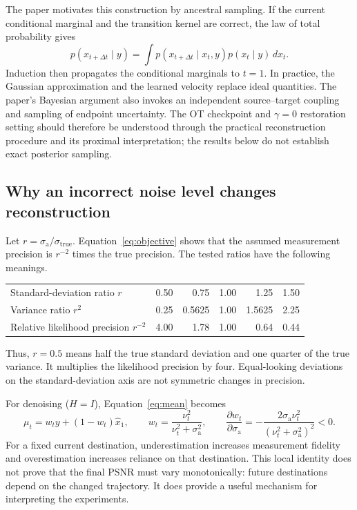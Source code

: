 \documentclass[10pt,letterpaper]{article}
\newcommand{\sa}{\sigma_{\mathrm a}}
\newcommand{\st}{\sigma_{\mathrm{true}}}
\newcommand{\xhat}{\widehat{x}_1}
\begin{document}
The paper motivates this construction by ancestral sampling. If the current conditional marginal and the transition kernel are correct, the law of total probability gives
\begin{equation}
 p(x_{t+\Delta t}\mid y)=\int p(x_{t+\Delta t}\mid x_t,y)p(x_t\mid y)\,dx_t.
 \label{eq:ancestral}
\end{equation}
Induction then propagates the conditional marginals to $t=1$. In practice, the Gaussian approximation and the learned velocity replace ideal quantities. The paper's Bayesian argument also invokes an independent source--target coupling and sampling of endpoint uncertainty. The OT checkpoint and $\gamma=0$ restoration setting should therefore be understood through the practical reconstruction procedure and its proximal interpretation; the results below do not establish exact posterior sampling.

\subsection{Why an incorrect noise level changes reconstruction}
Let $r=\sa/\st$. Equation~\eqref{eq:objective} shows that the assumed measurement precision is $r^{-2}$ times the true precision. The tested ratios have the following meanings.
\begin{center}
\begin{tabular}{lrrrrr}
\toprule
Standard-deviation ratio $r$ & 0.50 & 0.75 & 1.00 & 1.25 & 1.50\\
Variance ratio $r^2$ & 0.25 & 0.5625 & 1.00 & 1.5625 & 2.25\\
Relative likelihood precision $r^{-2}$ & 4.00 & 1.78 & 1.00 & 0.64 & 0.44\\
\bottomrule
\end{tabular}
\end{center}
Thus, $r=0.5$ means half the true standard deviation and one quarter of the true variance. It multiplies the likelihood precision by four. Equal-looking deviations on the standard-deviation axis are not symmetric changes in precision.

For denoising ($H=I$), Equation~\eqref{eq:mean} becomes
\begin{equation}
 \mu_t=w_t y+(1-w_t)\xhat,\qquad
 w_t=\frac{\nu_t^2}{\nu_t^2+\sa^2},\qquad
 \frac{\partial w_t}{\partial\sa}
 =-\frac{2\sa\nu_t^2}{(\nu_t^2+\sa^2)^2}<0.
 \label{eq:weight}
\end{equation}
For a fixed current destination, underestimation increases measurement fidelity and overestimation increases reliance on that destination. This local identity does not prove that the final PSNR must vary monotonically: future destinations depend on the changed trajectory. It does provide a useful mechanism for interpreting the experiments.
\end{document}
